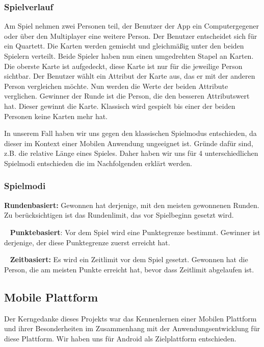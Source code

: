 \documentclass{scrartcl}
\begin{document}
\subsubsection{Spielverlauf}

Am Spiel nehmen zwei Personen teil, der Benutzer der App ein Computergegener
oder über den Multiplayer eine weitere Person. Der Benutzer entscheidet sich für
ein Quartett. Die Karten werden gemischt und gleichmäßig unter den beiden
Spielern verteilt. Beide Spieler haben nun einen umgedrehten Stapel an Karten.
Die oberste Karte ist aufgedeckt, diese Karte ist nur für die jeweilige Person
sichtbar. Der Benutzer wählt ein Attribut der Karte aus, das er mit der anderen
Person vergleichen möchte. Nun werden die Werte der beiden Attribute verglichen.
Gewinner der Runde ist die Person, die den besseren Attributswert hat. Dieser
gewinnt die Karte. Klassisch wird gespielt bis einer der beiden Personen keine
Karten mehr hat.

In unserem Fall haben wir uns gegen den klassischen Spielmodus entschieden, da
dieser im Kontext einer Mobilen Anwendung ungeeignet ist. Gründe dafür sind,
z.B. die relative Länge eines Spieles.
\newline
Daher haben wir uns für 4 unterschiedlichen Spielmodi entschieden die im
Nachfolgenden erklärt werden.

\subsubsection{Spielmodi}

\textbf{Rundenbasiert:}
Gewonnen hat derjenige, mit den meisten gewonnenen Runden. Zu berücksichtigen
ist das Rundenlimit, das vor Spielbeginn gesetzt wird.

\ \newline
\textbf{Punktebasiert}:
Vor dem Spiel wird eine Punktegrenze bestimmt. Gewinner ist derjenige, der diese
Punktegrenze zuerst erreicht hat.

\ \newline
\textbf{Zeitbasiert:}
Es wird ein Zeitlimit vor dem Spiel gesetzt. Gewonnen hat die Person, die
am meisten Punkte erreicht hat, bevor dass Zeitlimit abgelaufen ist.

\subsection{Mobile Plattform}
Der Kerngedanke dieses Projekts war das Kennenlernen einer Mobilen Plattform und
ihrer Besonderheiten im Zusammenhang mit der Anwendungsentwicklung für diese
Plattform. Wir haben uns für Android als Zielplattform entschieden.
\end{document}
